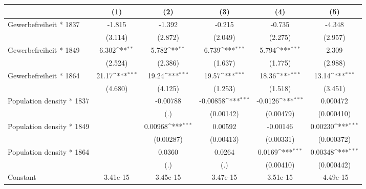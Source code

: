 {
\def\sym#1{\ifmmode^{#1}\else\(^{#1}\)\fi}
\begin{tabular}{l*{5}{c}}
\hline\hline
                    &\multicolumn{1}{c}{(1)}         &\multicolumn{1}{c}{(2)}         &\multicolumn{1}{c}{(3)}         &\multicolumn{1}{c}{(4)}         &\multicolumn{1}{c}{(5)}         \\
\hline
Gewerbefreiheit * 1837&      -1.815         &      -1.392         &      -0.215         &      -0.735         &      -4.348         \\
                    &     (3.114)         &     (2.872)         &     (2.049)         &     (2.275)         &     (2.957)         \\
[1em]
Gewerbefreiheit * 1849&       6.302\sym{**} &       5.782\sym{**} &       6.739\sym{***}&       5.794\sym{***}&       2.309         \\
                    &     (2.524)         &     (2.386)         &     (1.637)         &     (1.775)         &     (2.988)         \\
[1em]
Gewerbefreiheit * 1864&       21.17\sym{***}&       19.24\sym{***}&       19.57\sym{***}&       18.36\sym{***}&       13.14\sym{***}\\
                    &     (4.680)         &     (4.125)         &     (1.253)         &     (1.518)         &     (3.451)         \\
[1em]
Population density * 1837&                     &    -0.00788         &    -0.00858\sym{***}&     -0.0126\sym{***}&    0.000472         \\
                    &                     &         (.)         &   (0.00142)         &   (0.00479)         &  (0.000410)         \\
[1em]
Population density * 1849&                     &     0.00968\sym{***}&     0.00592         &    -0.00146         &     0.00230\sym{***}\\
                    &                     &   (0.00287)         &   (0.00413)         &   (0.00331)         &  (0.000372)         \\
[1em]
Population density * 1864&                     &      0.0360         &      0.0264         &      0.0169\sym{***}&     0.00348\sym{***}\\
                    &                     &         (.)         &         (.)         &   (0.00410)         &  (0.000442)         \\
[1em]
Constant            &    3.41e-15         &    3.45e-15         &    3.47e-15         &    3.51e-15         &   -4.49e-15         \\

\end{tabular}}
